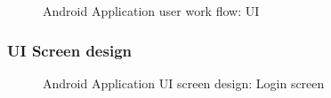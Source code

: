 \begin{figure}[H]
\caption{Android Application user work flow: UI}
\end{figure}

\newpage
\subsubsection{UI Screen design}
\vspace{0.2in}

\begin{figure}[H]
\centering	
{}
\caption{Android Application UI screen design: Login screen}
\end{figure}

